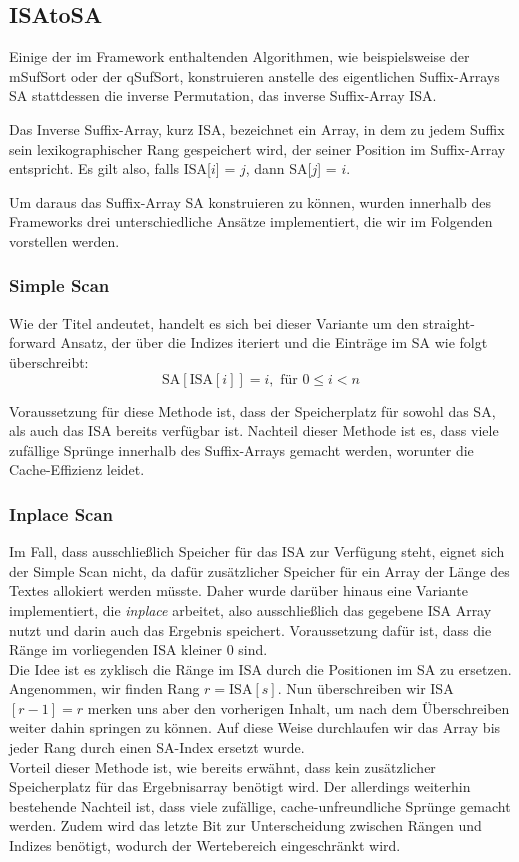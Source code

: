 \subsection{ISAtoSA}
\label{isa2sa}
Einige der im Framework enthaltenden Algorithmen, wie beispielsweise der mSufSort oder der qSufSort, konstruieren anstelle des eigentlichen Suffix-Arrays SA stattdessen die inverse Permutation, das inverse Suffix-Array ISA. \\
\begin{definition}
Das Inverse Suffix-Array, kurz ISA, bezeichnet ein Array, in dem zu jedem
Suffix sein lexikographischer Rang gespeichert wird, der seiner Position
im Suffix-Array entspricht.
Es gilt also, falls ISA[$i$] = $j$, dann SA[$j$] = $i$.
\end{definition}
Um daraus das Suffix-Array SA konstruieren zu können, wurden innerhalb des Frameworks drei unterschiedliche Ansätze implementiert, die wir im Folgenden vorstellen werden.
\subsubsection{Simple Scan}
Wie der Titel andeutet, handelt es sich bei dieser Variante um den straight-forward Ansatz, der über die Indizes iteriert und die Einträge im SA wie folgt überschreibt:
\begin{equation}
\text{SA}[\text{ISA}[i]]=i, \text{ für } 0\leq i < n
\end{equation}

Voraussetzung für diese Methode ist, dass der Speicherplatz für sowohl das SA, als auch das ISA bereits verfügbar ist. Nachteil dieser Methode ist es, dass viele zufällige Sprünge innerhalb des Suffix-Arrays gemacht werden, worunter die Cache-Effizienz leidet. 
\subsubsection{Inplace Scan}
Im Fall, dass ausschließlich Speicher für das ISA zur Verfügung steht, eignet sich der Simple Scan nicht, da dafür zusätzlicher Speicher für ein Array der Länge des Textes allokiert werden müsste. Daher wurde darüber hinaus eine Variante implementiert, die \textit{inplace} arbeitet, also ausschließlich das gegebene ISA Array nutzt und darin auch das Ergebnis speichert. Voraussetzung dafür ist, dass die Ränge im vorliegenden ISA kleiner $0$ sind.\\
Die Idee ist es zyklisch die Ränge im ISA durch die Positionen im SA zu ersetzen. Angenommen, wir finden Rang $r = $ISA$[s]$. Nun überschreiben wir ISA$[r-1]=r$ merken uns aber den vorherigen Inhalt, um nach dem Überschreiben weiter dahin springen zu können. Auf diese Weise durchlaufen wir das Array bis jeder Rang durch einen SA-Index ersetzt wurde.\\
Vorteil dieser Methode ist, wie bereits erwähnt, dass kein zusätzlicher Speicherplatz für das Ergebnisarray benötigt wird. Der allerdings weiterhin bestehende Nachteil ist, dass viele zufällige, cache-unfreundliche Sprünge gemacht werden. Zudem wird das letzte Bit zur Unterscheidung zwischen Rängen und Indizes benötigt, wodurch der Wertebereich eingeschränkt wird.

